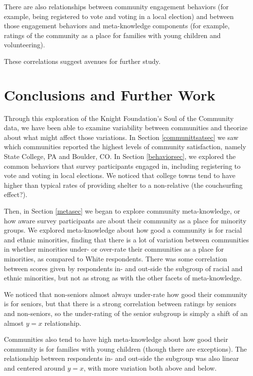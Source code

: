\documentclass[smallextended]{svjour3}\usepackage[]{graphicx}\usepackage[]{color}
\begin{document}
There are also relationships between community engagement behaviors (for example, being registered to vote and voting in a local election) and between those engagement behaviors and meta-knowledge components (for example, ratings of the community as a place for families with young children and volunteering). 

These correlations suggest avenues for further study. 

\section{Conclusions and Further Work}
Through this exploration of the Knight Foundation's Soul of the Community data, we have been able to examine variability between communities and theorize about what might affect those variations. In Section \ref{communittsatsec} we saw which communities reported the highest levels of community satisfaction, namely State College, PA and Boulder, CO. In Section \ref{behaviorsec}, we explored the common behaviors that survey participants engaged in, including registering to vote and voting in local elections. We noticed that college towns tend to have higher than typical rates of providing shelter to a non-relative (the couchsurfing effect?).

Then, in Section \ref{metasec} we began to explore community meta-knowledge, or how aware survey participants are about their community as a place for minority groups. We explored meta-knowledge about how good a community is for racial and ethnic minorities, finding that there is a lot of variation between communities in whether minorities under- or over-rate their communities as a place for minorities, as compared to White respondents. There was some correlation between scores given by respondents in- and out-side the subgroup of racial and ethnic minorities, but not as strong as with the other facets of meta-knowledge. 

We noticed that non-seniors almost always under-rate how good their community is for seniors, but that there is a strong correlation between ratings by seniors and non-seniors, so the under-rating of the senior subgroup is simply a shift of an almost $y=x$ relationship. 

Communities also tend to have high meta-knowledge about how good their community is for families with young children (though there are exceptions). The relationship between respondents in- and out-side the subgroup was also linear and centered around $y=x$, with more variation both above and below. 
\end{document}
